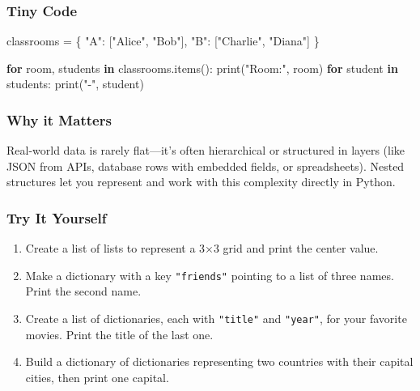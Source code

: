 \documentclass[
  letterpaper,
  DIV=11,
  numbers=noendperiod]{scrreprt}
\newenvironment{Shaded}{\begin{snugshade}}{\end{snugshade}}
\newcommand{\BuiltInTok}[1]{\textcolor[rgb]{0.00,0.23,0.31}{#1}}
\newcommand{\ControlFlowTok}[1]{\textcolor[rgb]{0.00,0.23,0.31}{\textbf{#1}}}
\newcommand{\KeywordTok}[1]{\textcolor[rgb]{0.00,0.23,0.31}{\textbf{#1}}}
\newcommand{\NormalTok}[1]{\textcolor[rgb]{0.00,0.23,0.31}{#1}}
\newcommand{\OperatorTok}[1]{\textcolor[rgb]{0.37,0.37,0.37}{#1}}
\newcommand{\StringTok}[1]{\textcolor[rgb]{0.13,0.47,0.30}{#1}}
\providecommand{\tightlist}{%
  \setlength{\itemsep}{0pt}\setlength{\parskip}{0pt}}
\begin{document}
\subsubsection{Tiny Code}\label{tiny-code-29}

\begin{Shaded}
\begin{Highlighting}[]
\NormalTok{classrooms }\OperatorTok{=}\NormalTok{ \{}
    \StringTok{"A"}\NormalTok{: [}\StringTok{"Alice"}\NormalTok{, }\StringTok{"Bob"}\NormalTok{],}
    \StringTok{"B"}\NormalTok{: [}\StringTok{"Charlie"}\NormalTok{, }\StringTok{"Diana"}\NormalTok{]}
\NormalTok{\}}

\ControlFlowTok{for}\NormalTok{ room, students }\KeywordTok{in}\NormalTok{ classrooms.items():}
    \BuiltInTok{print}\NormalTok{(}\StringTok{"Room:"}\NormalTok{, room)}
    \ControlFlowTok{for}\NormalTok{ student }\KeywordTok{in}\NormalTok{ students:}
        \BuiltInTok{print}\NormalTok{(}\StringTok{"{-}"}\NormalTok{, student)}
\end{Highlighting}
\end{Shaded}

\subsubsection{Why it Matters}\label{why-it-matters-29}

Real-world data is rarely flat---it's often hierarchical or structured
in layers (like JSON from APIs, database rows with embedded fields, or
spreadsheets). Nested structures let you represent and work with this
complexity directly in Python.

\subsubsection{Try It Yourself}\label{try-it-yourself-29}

\begin{enumerate}
\def\labelenumi{\arabic{enumi}.}
\tightlist
\item
  Create a list of lists to represent a 3×3 grid and print the center
  value.
\item
  Make a dictionary with a key \texttt{"friends"} pointing to a list of
  three names. Print the second name.
\item
  Create a list of dictionaries, each with \texttt{"title"} and
  \texttt{"year"}, for your favorite movies. Print the title of the last
  one.
\item
  Build a dictionary of dictionaries representing two countries with
  their capital cities, then print one capital.
\end{enumerate}
\end{document}
